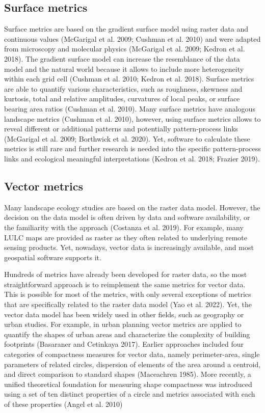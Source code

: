 \documentclass[
  10pt,
  a4paperpaper,
]{article}
\begin{document}
\subsection{Surface metrics}\label{surface-metrics}

Surface metrics are based on the gradient surface model using raster
data and continuous values (McGarigal et al. 2009; Cushman et al. 2010)
and were adapted from microscopy and molecular physics (McGarigal et al.
2009; Kedron et al. 2018). The gradient surface model can increase the
resemblance of the data model and the natural world because it allows to
include more heterogeneity within each grid cell (Cushman et al. 2010;
Kedron et al. 2018). Surface metrics are able to quantify various
characteristics, such as roughness, skewness and kurtosis, total and
relative amplitudes, curvatures of local peaks, or surface bearing area
ratios (Cushman et al. 2010). Many surface metrics have analogous
landscape metrics (Cushman et al. 2010), however, using surface metrics
allows to reveal different or additional patterns and potentially
pattern-process links (McGarigal et al. 2009; Borthwick et al. 2020).
Yet, software to calculate these metrics is still rare and further
research is needed into the specific pattern-process links and
ecological meaningful interpretations (Kedron et al. 2018; Frazier
2019).

\subsection{Vector metrics}\label{vector-metrics}

Many landscape ecology studies are based on the raster data model.
However, the decision on the data model is often driven by data and
software availability, or the familiarity with the approach (Costanza et
al. 2019). For example, many LULC maps are provided as raster as they
often related to underlying remote sensing products. Yet, nowadays,
vector data is increasingly available, and most geospatial software
supports it.

Hundreds of metrics have already been developed for raster data, so the
most straightforward approach is to reimplement the same metrics for
vector data. This is possible for most of the metrics, with only several
exceptions of metrics that are specifically related to the raster data
model (Yao et al. 2022). Yet, the vector data model has been widely used
in other fields, such as geography or urban studies. For example, in
urban planning vector metrics are applied to quantify the shapes of
urban areas and characterize the complexity of building footprints
(Basaraner and Cetinkaya 2017). Earlier approaches included four
categories of compactness measures for vector data, namely
perimeter-area, single parameters of related circles, dispersion of
elements of the area around a centroid, and direct comparison to
standard shapes (Maceachren 1985). More recently, a unified theoretical
foundation for measuring shape compactness was introduced using a set of
ten distinct properties of a circle and metrics associated with each of
these properties (Angel et al. 2010)
\end{document}
